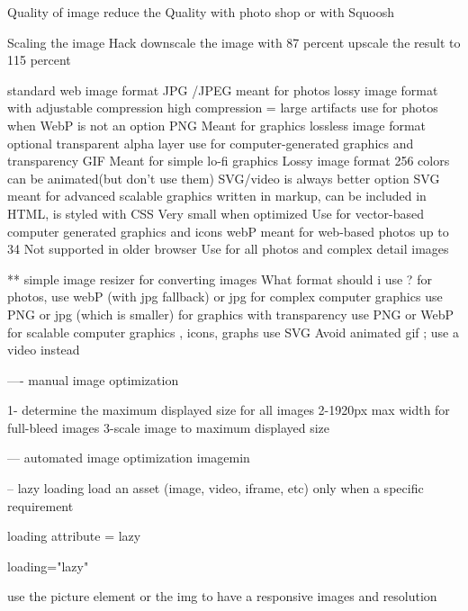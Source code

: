 Quality of image 
  reduce the Quality with photo shop 
  or with Squoosh 

  Scaling the image Hack 
  downscale the image with 87 percent 
  upscale the result to 115 percent 

  standard web image format 
    JPG /JPEG 
      meant for photos 
      lossy image format with adjustable compression 
      high compression = large artifacts
      use for photos when WebP is not an option 
    PNG
      Meant for graphics 
      lossless image format 
      optional transparent alpha layer 
      use for computer-generated graphics and transparency 
    GIF
      Meant for simple lo-fi graphics 
      Lossy image format 
      256 colors 
      can be animated(but don't use them)
      SVG/video is always better option 
    SVG     
      meant for advanced scalable graphics 
      written in markup, can be included in HTML, is styled with CSS 
      Very small when optimized 
      Use for vector-based computer generated graphics and icons
    webP
      meant for web-based photos 
      up to 34%
      Not supported in older browser 
      Use for all photos and complex detail images 


** simple image resizer 
  for converting images 
What format should i use ? 
for photos, use webP (with jpg fallback) or jpg 
for complex computer graphics use PNG or jpg (which is smaller)
for graphics with transparency use PNG or WebP
for scalable computer graphics , icons, graphs use SVG 
Avoid animated gif ; use a video instead 

---- manual image optimization 

1- determine the maximum displayed size for all images 
2-1920px max width for full-bleed images
3-scale image to maximum displayed size 

--- automated image optimization 
  imagemin 


-- lazy loading 
load an asset (image, video, iframe, etc) only when a specific requirement 

loading attribute = lazy   

loading="lazy" 

use the picture element or the img to have a responsive images and resolution 

